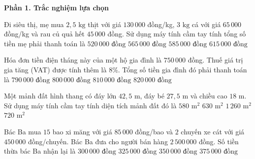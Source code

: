 \textbf{Phần 1. Trắc nghiệm lựa chọn}

\begin{ex} %
Đi siêu thị, mẹ mua $2{,}5\text{ kg}$ thịt với giá $130\,000$ đồng/kg, $3\text{ kg}$ cá với giá $65\,000$ đồng/kg và rau củ quả hết $45\,000$ đồng. Sử dụng máy tính cầm tay tính tổng số tiền mẹ phải thanh toán là
\choice
{$520\,000\text{ đồng}$}
{\True $565\,000\text{ đồng}$}
{$585\,000\text{ đồng}$}
{$615\,000\text{ đồng}$}
\end{ex}

\begin{ex} %
Hóa đơn tiền điện tháng này của một hộ gia đình là $750\,000$ đồng. Thuế giá trị gia tăng (VAT) được tính thêm là $8\%$. Tổng số tiền gia đình đó phải thanh toán là
\choice
{$790\,000\text{ đồng}$}
{$800\,000\text{ đồng}$}
{\True $810\,000\text{ đồng}$}
{$820\,000\text{ đồng}$}
\end{ex}

\begin{ex} %
Một mảnh đất hình thang có đáy lớn $42{,}5\text{ m}$, đáy bé $27{,}5\text{ m}$ và chiều cao $18\text{ m}$. Sử dụng máy tính cầm tay tính diện tích mảnh đất đó là
\choice
{$580\text{ m}^2$}
{\True $630\text{ m}^2$}
{$1\,260\text{ m}^2$}
{$720\text{ m}^2$}
\end{ex}

\begin{ex} %
Bác Ba mua $15$ bao xi măng với giá $85\,000$ đồng/bao và $2$ chuyến xe cát với giá $450\,000$ đồng/chuyến. Bác Ba đưa cho người bán hàng $2\,500\,000$ đồng. Số tiền thừa bác Ba nhận lại là
\choice
{$300\,000\text{ đồng}$}
{\True $325\,000\text{ đồng}$}
{$350\,000\text{ đồng}$}
{$375\,000\text{ đồng}$}
\end{ex}

